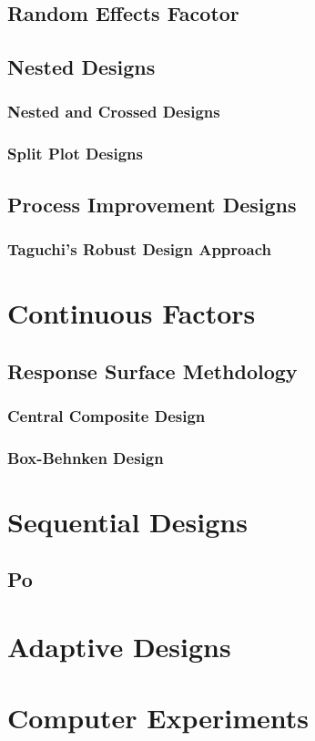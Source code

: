 \subsection{Random Effects Facotor}

\subsection{Nested Designs}


\subsubsection{Nested and Crossed Designs}

\subsubsection{Split Plot Designs}




\subsection{Process Improvement Designs}

\subsubsection{Taguchi's Robust Design Approach}



\section{Continuous Factors}



\subsection{Response Surface Methdology}

\subsubsection{Central Composite Design}

\subsubsection{Box-Behnken Design}




\section{Sequential Designs}

\subsection{Po}



\section{Adaptive Designs}



\section{Computer Experiments}

